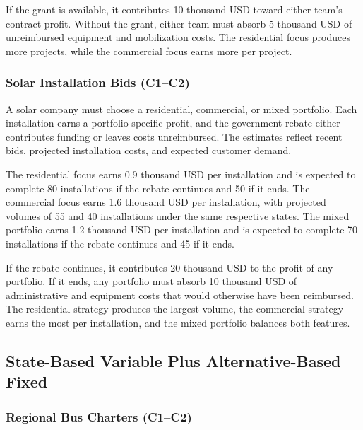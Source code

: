 	If the grant is available, it contributes 10 thousand USD toward either team’s contract profit. Without the grant, either team must absorb 5 thousand USD of unreimbursed equipment and mobilization costs. The residential focus produces more projects, while the commercial focus earns more per project.
	
	\subsubsection{Solar Installation Bids (C1--C2)}
	\label{sec:problem19-solar-installation-bids-c1-c2}
	
	A solar company must choose a residential, commercial, or mixed portfolio. Each installation earns a portfolio-specific profit, and the government rebate either contributes funding or leaves costs unreimbursed. The estimates reflect recent bids, projected installation costs, and expected customer demand.
	
	The residential focus earns 0.9 thousand USD per installation and is expected to complete 80 installations if the rebate continues and 50 if it ends. The commercial focus earns 1.6 thousand USD per installation, with projected volumes of 55 and 40 installations under the same respective states. The mixed portfolio earns 1.2 thousand USD per installation and is expected to complete 70 installations if the rebate continues and 45 if it ends.
	
	If the rebate continues, it contributes 20 thousand USD to the profit of any portfolio. If it ends, any portfolio must absorb 10 thousand USD of administrative and equipment costs that would otherwise have been reimbursed. The residential strategy produces the largest volume, the commercial strategy earns the most per installation, and the mixed portfolio balances both features.

	
	\subsection{State-Based Variable Plus Alternative-Based Fixed}
	\label{sec:state-based-variable-payoff-plus-alternative-based-fixed-payoff}



	\subsubsection{Regional Bus Charters (C1--C2)}
	\label{sec:problem20-regional-bus-charters-c1-c2}
	
